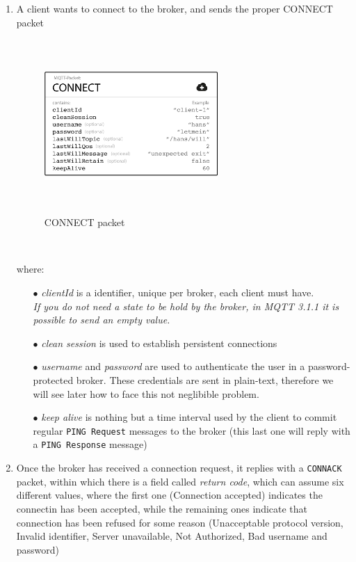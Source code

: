 \documentclass[12pt]{report}
\begin{document}
\begin{enumerate}
\setlength{\itemindent}{+5mm}
\item A client wants to connect to the broker, and sends the proper CONNECT packet

\begin{figure}[H]
\includegraphics[width=6.6cm,height=6.6cm,keepaspectratio]{connect_message}
\centering
\caption{CONNECT packet}
\end{figure}\

where:

\begin{itemize}
\setlength{\itemindent}{+4mm}
  \item[$\bullet$] \emph{clientId} is a identifier, unique per broker, each client must have.\\
  \emph{If you do not need a state to be hold by the broker, in MQTT 3.1.1 it is possible to send an empty value.}
  \item[$\bullet$] \emph{clean session} is used to establish persistent connections
  \item[$\bullet$] \emph{username} and \emph{password} are used to authenticate the user in a password-protected broker. These credentials are sent in plain-text, therefore we will see later how to face this not neglibible problem.
  \item[$\bullet$] \emph{keep alive} is nothing but a time interval used by the client to commit regular \texttt{PING Request} messages to the broker (this last one will reply with a \texttt{PING Response} message)
\end{itemize}

\item Once the broker has received a connection request, it replies with a \texttt{CONNACK} packet, within which there is a field called \emph{return code}, which can assume six different values, where the first one (Connection accepted) indicates the connectin has been accepted, while the remaining ones indicate that connection has been refused for some reason (Unacceptable protocol version, Invalid identifier, Server unavailable, Not Authorized, Bad username and password)


\end{enumerate}
\end{document}

